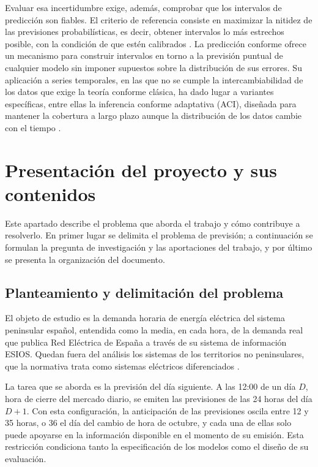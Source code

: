 Evaluar esa incertidumbre exige, además, comprobar que los intervalos de
predicción son fiables. El criterio de referencia consiste en maximizar la
nitidez de las previsiones probabilísticas, es decir, obtener intervalos lo
más estrechos posible, con la condición de que estén calibrados
\parencite{gneiting2007probabilistic}. La predicción conforme ofrece un
mecanismo para construir intervalos en torno a la previsión puntual de
cualquier modelo sin imponer supuestos sobre la distribución de sus errores. Su aplicación a series
temporales, en las que no se cumple la intercambiabilidad de los datos que
exige la teoría conforme clásica, ha dado lugar a variantes específicas, entre
ellas la inferencia conforme adaptativa (ACI), diseñada para mantener la
cobertura a largo plazo aunque la distribución de los datos cambie con el
tiempo \parencite{gibbs2021adaptive}.

\section{Presentación del proyecto y sus contenidos}\label{sec:presentacion}

Este apartado describe el problema que aborda el trabajo y cómo contribuye a
resolverlo. En primer lugar se delimita el problema de previsión; a
continuación se formulan la pregunta de investigación y las aportaciones del
trabajo, y por último se presenta la organización del documento.

\subsection{Planteamiento y delimitación del problema}\label{sec:problema}

El objeto de estudio es la demanda horaria de energía eléctrica del sistema
peninsular español, entendida como la media, en cada hora, de la demanda real
que publica Red Eléctrica de España a través de su sistema de información
ESIOS. Quedan fuera del análisis los sistemas de los territorios no
peninsulares, que la normativa trata como sistemas eléctricos diferenciados
\parencite{ley2013sectorelectrico}.

La tarea que se aborda es la previsión del día siguiente. A las 12:00 de un
día $D$, hora de cierre del mercado diario, se emiten las previsiones de las
24 horas del día $D+1$. Con esta configuración, la anticipación de las
previsiones oscila entre 12 y 35 horas, o 36 el día del cambio de hora de
octubre, y cada una de ellas solo puede
apoyarse en la información disponible en el momento de su emisión. Esta
restricción condiciona tanto la especificación de los modelos como el diseño
de su evaluación.

